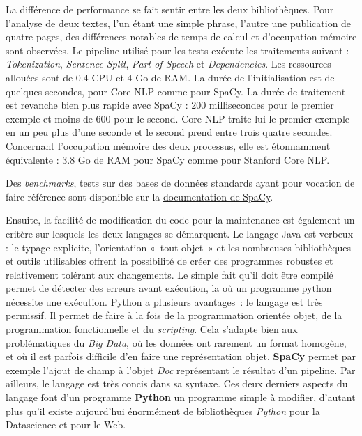 La différence de performance se fait sentir entre les deux bibliothèques. Pour l'analyse de deux textes, l'un étant une simple phrase, l'autre une publication de quatre pages, des différences notables de temps de calcul et d'occupation mémoire sont observées. Le pipeline utilisé pour les tests exécute les traitements suivant : \textit{Tokenization}, \textit{Sentence Split}, \textit{Part-of-Speech} et \textit{Dependencies}. Les ressources allouées sont de 0.4 CPU et 4 Go de RAM. La durée de l'initialisation est de quelques secondes, pour Core NLP comme pour SpaCy. La durée de traitement est revanche bien plus rapide avec SpaCy : 200 millisecondes pour le premier exemple et moins de 600 pour le second. Core NLP traite lui le premier exemple en un peu plus d'une seconde et le second prend entre trois quatre secondes. Concernant l'occupation mémoire des deux processus, elle est étonnamment équivalente : 3.8 Go de RAM pour SpaCy comme pour Stanford Core NLP. 

Des \textit{benchmarks}, tests sur des bases de données standards ayant pour vocation de faire référence sont disponible sur la  \href{https://spacy.io/usage/facts-figures}{documentation de SpaCy}.
\newline

Ensuite, la facilité de modification du code pour la maintenance est également un critère sur lesquels les deux langages se démarquent. Le langage Java est verbeux : le typage explicite, l'orientation «~tout objet~» et les nombreuses bibliothèques et outils utilisables offrent la possibilité de créer des programmes robustes et relativement tolérant aux changements. Le simple fait qu'il doit être compilé permet de détecter des erreurs avant exécution, la où un programme python nécessite une exécution. Python a plusieurs avantages~: le langage est très permissif. Il permet de faire à la fois de la programmation orientée objet, de la programmation fonctionnelle et du \textit{scripting}. Cela s'adapte bien aux problématiques du \textit{Big Data}, où les données ont rarement un format homogène, et où il est parfois difficile d'en faire une représentation objet. \textbf{SpaCy} permet par exemple l'ajout de champ à l'objet \textit{Doc} représentant le résultat d'un pipeline. Par ailleurs, le langage est très concis dans sa syntaxe. Ces deux derniers aspects du langage font d'un programme \textbf{Python} un programme simple à modifier, d'autant plus qu'il existe aujourd'hui énormément de bibliothèques \textit{Python} pour la Datascience et pour le Web.
\newline

